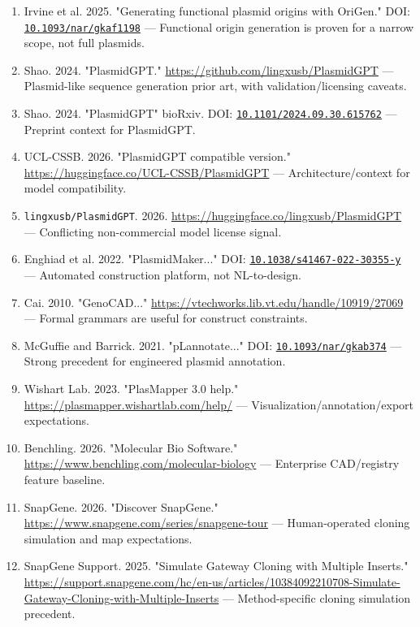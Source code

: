 \documentclass[11pt]{report}
\begin{document}
\begin{enumerate}
\item Irvine et al. 2025. "Generating functional plasmid origins with OriGen." DOI: \href{https://doi.org/10.1093/nar/gkaf1198}{\nolinkurl{10.1093/nar/gkaf1198}} — Functional origin generation is proven for a narrow scope, not full plasmids.
\item Shao. 2024. "PlasmidGPT." \url{https://github.com/lingxusb/PlasmidGPT} — Plasmid-like sequence generation prior art, with validation/licensing caveats.
\item Shao. 2024. "PlasmidGPT" bioRxiv. DOI: \href{https://doi.org/10.1101/2024.09.30.615762}{\nolinkurl{10.1101/2024.09.30.615762}} — Preprint context for PlasmidGPT.
\item UCL-CSSB. 2026. "PlasmidGPT compatible version." \url{https://huggingface.co/UCL-CSSB/PlasmidGPT} — Architecture/context for model compatibility.
\item \texttt{lingxusb/PlasmidGPT}. 2026. \url{https://huggingface.co/lingxusb/PlasmidGPT} — Conflicting non-commercial model license signal.
\item Enghiad et al. 2022. "PlasmidMaker..." DOI: \href{https://doi.org/10.1038/s41467-022-30355-y}{\nolinkurl{10.1038/s41467-022-30355-y}} — Automated construction platform, not NL-to-design.
\item Cai. 2010. "GenoCAD..." \url{https://vtechworks.lib.vt.edu/handle/10919/27069} — Formal grammars are useful for construct constraints.
\item McGuffie and Barrick. 2021. "pLannotate..." DOI: \href{https://doi.org/10.1093/nar/gkab374}{\nolinkurl{10.1093/nar/gkab374}} — Strong precedent for engineered plasmid annotation.
\item Wishart Lab. 2023. "PlasMapper 3.0 help." \url{https://plasmapper.wishartlab.com/help/} — Visualization/annotation/export expectations.
\item Benchling. 2026. "Molecular Bio Software." \url{https://www.benchling.com/molecular-biology} — Enterprise CAD/registry feature baseline.
\item SnapGene. 2026. "Discover SnapGene." \url{https://www.snapgene.com/series/snapgene-tour} — Human-operated cloning simulation and map expectations.
\item SnapGene Support. 2025. "Simulate Gateway Cloning with Multiple Inserts." \url{https://support.snapgene.com/hc/en-us/articles/10384092210708-Simulate-Gateway-Cloning-with-Multiple-Inserts} — Method-specific cloning simulation precedent.

\end{enumerate}
\end{document}
